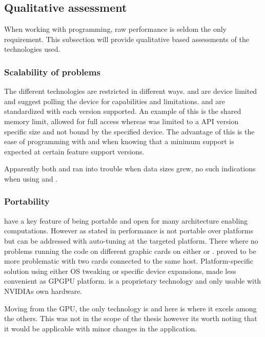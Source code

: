 \subsection{Qualitative assessment}

When working with programming, raw performance is seldom the only requirement. This subsection will provide qualitative based assessments of the technologies used.

\subsubsection{Scalability of problems}

The different technologies are restricted in different ways. {\CU} and {\OCL} are device limited and suggest polling the device for capabilities and limitations. {\DX} and {\GL} are standardized with each version supported. An example of this is the shared memory limit, {\CU} allowed for full access whereas {\DX} was limited to a \gls{API} version specific size and not bound by the specified device. The advantage of this is the ease of programming with {\DX} and {\GL} when knowing that a minimum support is expected at certain feature support versions.

Apparently both {\DX} and {\GL} ran into trouble when data sizes grew, no such indications when using {\CU} and {\OCL}.

\subsubsection{Portability}

{\OCL} have a key feature of being portable and open for many architecture enabling computations. However as stated in \cite{fang2011comprehensive, du2012cuda} performance is not portable over platforms but can be addressed with auto-tuning at the targeted platform. There where no problems running the code on different graphic cards on either {\OCL} or {\DX}. {\GL} proved to be more problematic with two cards connected to the same host. Platform-specific solution using either \gls{OS} tweaking or specific device {\GL} expansions, made {\GL} less convenient as GPGPU platform. {\CU} is a proprietary technology and only usable with NVIDIAs own hardware.

Moving from the \gls{GPU}, the only technology is {\OCL} and here is where it excels among the others. This was not in the scope of the thesis however its worth noting that it would be applicable with minor changes in the application.

